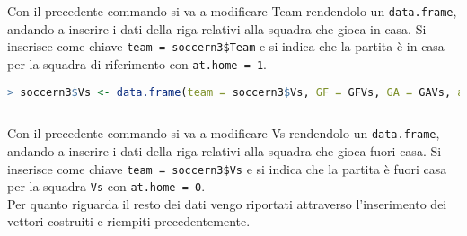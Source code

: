 \bigskip
Con il precedente commando si va a modificare \textsf{Team} rendendolo un \texttt{data.frame}, andando a inserire i dati della riga relativi alla squadra che gioca in casa. Si inserisce come chiave \texttt{team = soccern3\$Team} e si indica che la partita è in casa per la squadra di riferimento con \texttt{at.home = 1}.
\bigskip
\bigskip
\begin{lstlisting}[language=R]
> soccern3$Vs <- data.frame(team = soccern3$Vs, GF = GFVs, GA = GAVs, at.home = 0, Poss = PossVs, Sh = ShVs, SoT = ShTVs, G.Sh = G.ShVs, PAtt = PAttVs, PCmp. = PCmp.Vs, SPAtt = SPAttVs, SPCmp. = SPCmp.Vs, MPAtt = MPAttVs, MPCmp. = MPCmp.Vs, LPAtt = LPAttVs, LPCmp. = LPCmp.Vs, ToDef3rd = ToDef3rdVs, ToAtt3rd = ToAtt3rdVs, ToAttPen = ToAttPenVs, TotDist = ToDistVs, Fls = FlsVs, Fld = FldVs, Crs = CrsVs, Int = IntVs, TklWin = TklWinVs, Recov = RecovVs)
	
\end{lstlisting}
\bigskip
Con il precedente commando si va a modificare \textsf{Vs} rendendolo un \texttt{data.frame}, andando a inserire i dati della riga relativi alla squadra che gioca fuori casa. Si inserisce come chiave \texttt{team = soccern3\$Vs} e si indica che la partita è fuori casa per la squadra \texttt{Vs} con \texttt{at.home = 0}.\\ Per quanto riguarda il resto dei dati vengo riportati attraverso l'inserimento dei vettori costruiti e riempiti precedentemente.\\
